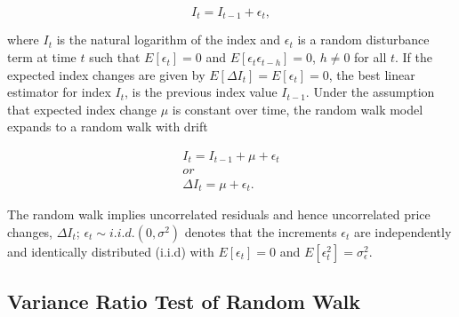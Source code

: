 \documentclass[AEJ,reqno, draftmode]{AEA}
\begin{document}
\begin{equation} \label{eq: a}
    I_t = I_{t-1} + \epsilon_t ,
\end{equation}

where $I_t$ is the natural logarithm of the index and $\epsilon_t$ is a random disturbance term at time $t$ such that $E[\epsilon_t] = 0$ and $E[\epsilon_t\epsilon_{t-h}] = 0$, $h \neq 0$ for all $t$. If the expected index changes are given by $E[\Delta I_t] = E[\epsilon_t] = 0$, the best linear estimator for index $I_t$, is the previous index value $I_{t-1}$. Under the assumption that expected index change $\mu$ is constant over time, the random walk model expands to a random walk with drift

\begin{equation}
\label{eq: b}
    \begin{gathered}
        I_t = I_{t-1} + \mu + \epsilon_t \\ or \\
          \Delta I_t = \mu + \epsilon_t.
      \end{gathered}
\end{equation}

The random walk implies uncorrelated residuals and hence uncorrelated price changes, $\Delta I_t$; $\epsilon_t \sim i.i.d.(0, \sigma^2)$ denotes that the increments $\epsilon_t$ are independently and identically distributed (i.i.d) with $E[\epsilon_t] = 0$ and $E[\epsilon_t^2] = \sigma_\epsilon^2$.


            
            
            
            
            



\subsection{Variance Ratio Test of Random Walk}
\end{document}
